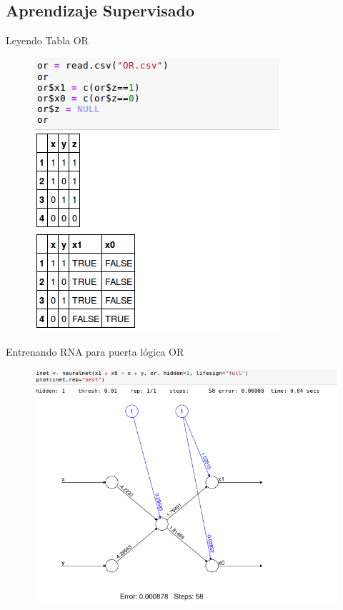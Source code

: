 \documentclass{beamer}
\begin{document}
\subsection{Aprendizaje Supervisado}
\begin{frame}
\begin{block}{Leyendo Tabla OR}
\begin{figure}
\includegraphics[scale=0.4]{reador.png}
\centering
\end{figure}
\end{block}
\end{frame}

\begin{frame}
\begin{block}{Entrenando RNA para puerta lógica OR}
\begin{figure}
\includegraphics[scale=0.4]{neuralnetor.png}
\centering
\end{figure}
\end{block}
\end{frame}
\end{document}
